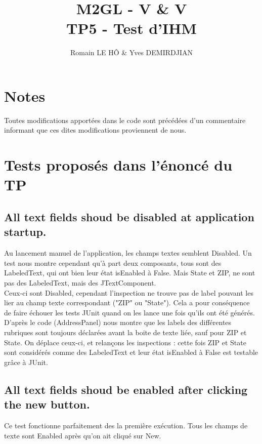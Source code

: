 \documentclass[a4paper,oneside,frenchb,12pt]{article}
\title{M2GL - V \& V\\TP5 - Test d'IHM}
\author{Romain LE HÔ \& Yves DEMIRDJIAN}
\begin{document}
\maketitle

\section {Notes}
Toutes modifications apportées dans le code sont précédées d'un commentaire informant que ces dites modifications proviennent de nous.

\section{Tests proposés dans l'énoncé du TP}

\subsection{All text fields shoud be disabled at application startup.} 
Au lancement manuel de l'application, les champs textes semblent Disabled. 
Un test nous montre cependant qu'à part deux composants, tous sont des LabeledText, 
qui ont bien leur état isEnabled à False. Mais State et ZIP, ne sont pas des LabeledText, 
mais des JTextComponent.\\

Ceux-ci sont Disabled, cependant l'inspection ne trouve pas de label 
pouvant les lier au champ texte correspondant ("ZIP" ou "State"). 
Cela a pour conséquence de faire échouer les tests JUnit quand on les lance 
une fois qu'ils ont été générés.\\

D'après le code (AddressPanel) nous montre que les labels des différentes rubriques 
sont toujours déclarées avant la boite de texte liée, sauf pour ZIP et State. 
On déplace ceux-ci, et relançons les inspections : cette fois ZIP et State sont 
considérés comme des LabeledText et leur état isEnabled à False est testable grâce 
à JUnit.\\

\subsection{All text fields shoud be enabled after clicking the new button.}
Ce test fonctionne parfaitement des la première exécution. Tous les champs 
de texte sont Enabled après qu'on ait cliqué sur New.\\
\end{document}
